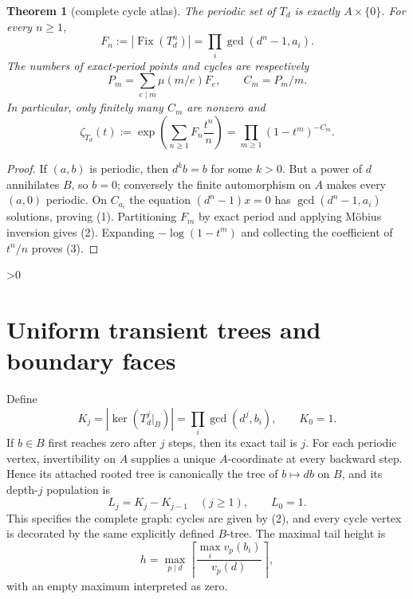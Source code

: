 \documentclass[10pt]{article}
\newtheorem{theorem}{Theorem}
\providecommand{\CRevisionRound}{2}
\newcommand{\Fix}{\operatorname{Fix}}
\begin{document}
\begin{theorem}[complete cycle atlas]
The periodic set of $T_d$ is exactly $A\times\{0\}$.  For every $n\geq1$,
\begin{equation}
 F_n:=|\Fix(T_d^n)|=\prod_i\gcd(d^n-1,a_i).                 \tag{1}
\end{equation}
The numbers of exact-period points and cycles are respectively
\begin{equation}
 P_m=\sum_{e\mid m}\mu(m/e)F_e,\qquad C_m=P_m/m.           \tag{2}
\end{equation}
In particular, only finitely many $C_m$ are nonzero and
\begin{equation}
 \zeta_{T_d}(t):=\exp\!\left(\sum_{n\geq1}F_n\frac{t^n}{n}\right)
 =\prod_{m\geq1}(1-t^m)^{-C_m}.                            \tag{3}
\end{equation}
\end{theorem}
\begin{proof}
If $(a,b)$ is periodic, then $d^k b=b$ for some $k>0$.  But a power of $d$
annihilates $B$, so $b=0$; conversely the finite automorphism on $A$ makes
every $(a,0)$ periodic.  On $C_{a_i}$ the equation
$(d^n-1)x=0$ has $\gcd(d^n-1,a_i)$ solutions, proving (1).  Partitioning
$F_m$ by exact period and applying M\"obius inversion gives (2).  Expanding
$-\log(1-t^m)$ and collecting the coefficient of $t^n/n$ proves (3).
\end{proof}

\ifnum\CRevisionRound>0
\section{Uniform transient trees and boundary faces}
Define
\[
 K_j=\left|\ker(T_d^j|_B)\right|=\prod_i\gcd(d^j,b_i),\qquad K_0=1.
\]
If $b\in B$ first reaches zero after $j$ steps, then its exact tail is $j$.
For each periodic vertex, invertibility on $A$ supplies a unique $A$-coordinate
at every backward step.  Hence its attached rooted tree is canonically the
tree of $b\mapsto db$ on $B$, and its depth-$j$ population is
\begin{equation}
 L_j=K_j-K_{j-1}\quad(j\geq1),\qquad L_0=1.                \tag{4}
\end{equation}
This specifies the complete graph: cycles are given by (2), and every cycle
vertex is decorated by the same explicitly defined $B$-tree.  The maximal
tail height is
\begin{equation}
 h=\max_{p\mid d}\left\lceil
 \frac{\max_i v_p(b_i)}{v_p(d)}\right\rceil,              \tag{5}
\end{equation}
with an empty maximum interpreted as zero.
\end{document}
